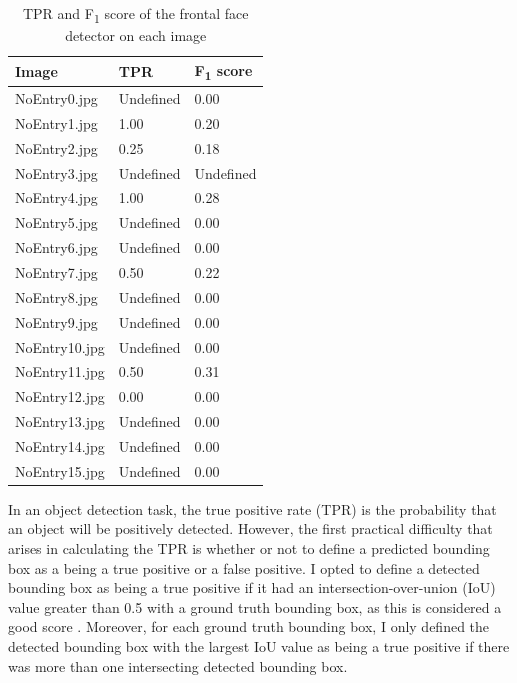\documentclass[onecolumn, 11pt, a4paper]{article}
\begin{document}
\begin{table}
  \vspace{-2.5em}
  \begin{center}
  \caption{TPR and F\textsubscript{1} score of the frontal face detector on each image}\label{tab:face}
  \begin{tabular}{l | l l} 
    \hline\hline
    Image & TPR & F\textsubscript{1} score\\
    \hline
    NoEntry0.jpg & Undefined & 0.00 \\ 
    NoEntry1.jpg & 1.00 & 0.20 \\ 
    NoEntry2.jpg & 0.25 & 0.18 \\ 
    NoEntry3.jpg & Undefined & Undefined \\ 
    NoEntry4.jpg & 1.00 & 0.28 \\ 
    NoEntry5.jpg & Undefined & 0.00 \\ 
    NoEntry6.jpg & Undefined & 0.00 \\ 
    NoEntry7.jpg & 0.50 & 0.22 \\ 
    NoEntry8.jpg & Undefined & 0.00 \\ 
    NoEntry9.jpg & Undefined & 0.00 \\ 
    NoEntry10.jpg & Undefined & 0.00 \\ 
    NoEntry11.jpg & 0.50 & 0.31 \\ 
    NoEntry12.jpg & 0.00 & 0.00 \\ 
    NoEntry13.jpg & Undefined & 0.00 \\ 
    NoEntry14.jpg & Undefined & 0.00 \\ 
    NoEntry15.jpg & Undefined & 0.00 \\ 
    \hline
  \end{tabular}
  \end{center}
\end{table} 

In an object detection task, the true positive rate (TPR) is the probability that an object will be positively detected.
However, the first practical difficulty that arises in calculating the TPR is whether or not to define a predicted bounding box as a being a true positive or a false positive.
I opted to define a detected bounding box as being a true positive if it had an intersection-over-union (IoU) value greater than 0.5 with a ground truth bounding box, as this is considered a good score \cite{iou}.
Moreover, for each ground truth bounding box, I only defined the detected bounding box with the largest IoU value as being a true positive if there was more than one intersecting detected bounding box.
\end{document}

